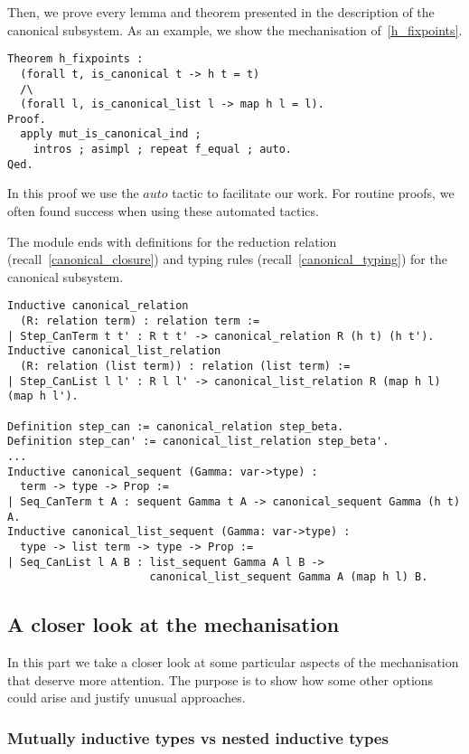 Then, we prove every lemma and theorem presented in the description of the canonical subsystem.
As an example, we show the mechanisation of~\cref{h_fixpoints}.
\begin{lstlisting}[language=Coq]
Theorem h_fixpoints :
  (forall t, is_canonical t -> h t = t)
  /\
  (forall l, is_canonical_list l -> map h l = l).
Proof.
  apply mut_is_canonical_ind ;
    intros ; asimpl ; repeat f_equal ; auto.
Qed.
\end{lstlisting}
In this proof we use the \lst$auto$ tactic to facilitate our work.
For routine proofs, we often found success when using these automated tactics.

The module ends with definitions for the reduction relation (recall~\cref{canonical_closure}) and typing rules (recall~\cref{canonical_typing}) for the canonical subsystem.
\begin{lstlisting}[language=Coq]
Inductive canonical_relation
  (R: relation term) : relation term :=
| Step_CanTerm t t' : R t t' -> canonical_relation R (h t) (h t').
Inductive canonical_list_relation
  (R: relation (list term)) : relation (list term) :=
| Step_CanList l l' : R l l' -> canonical_list_relation R (map h l) (map h l').

Definition step_can := canonical_relation step_beta.
Definition step_can' := canonical_list_relation step_beta'.
...
Inductive canonical_sequent (Gamma: var->type) :
  term -> type -> Prop :=
| Seq_CanTerm t A : sequent Gamma t A -> canonical_sequent Gamma (h t) A.
Inductive canonical_list_sequent (Gamma: var->type) :
  type -> list term -> type -> Prop :=
| Seq_CanList l A B : list_sequent Gamma A l B ->
                      canonical_list_sequent Gamma A (map h l) B.
\end{lstlisting}

\subsection{A closer look at the mechanisation}

In this part we take a closer look at some particular aspects of the mechanisation that deserve more attention.
The purpose is to show how some other options could arise and justify unusual approaches.

\subsubsection{Mutually inductive types vs nested inductive types}

